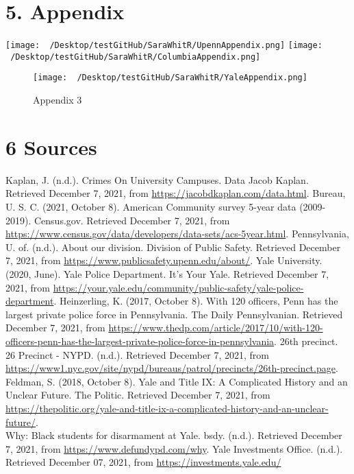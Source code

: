 \documentclass[
]{article}
\begin{document}
\hypertarget{appendix}{%
\section{5. Appendix}\label{appendix}}

\texttt{[image: ~/Desktop/testGitHub/SaraWhitR/UpennAppendix.png]}
\texttt{[image: ~/Desktop/testGitHub/SaraWhitR/ColumbiaAppendix.png]}

\begin{figure}
\centering
\texttt{[image: ~/Desktop/testGitHub/SaraWhitR/YaleAppendix.png]}
\caption{Appendix 3}
\end{figure}

\hypertarget{sources}{%
\section{6 Sources}\label{sources}}

Kaplan, J. (n.d.). Crimes On University Campuses. Data \textbar{} Jacob
Kaplan. Retrieved December 7, 2021, from
\url{https://jacobdkaplan.com/data.html}. Bureau, U. S. C. (2021,
October 8). American Community survey 5-year data (2009-2019).
Census.gov. Retrieved December 7, 2021, from
\url{https://www.census.gov/data/developers/data-sets/acs-5year.html}.
Pennsylvania, U. of. (n.d.). About our division. Division of Public
Safety. Retrieved December 7, 2021, from
\url{https://www.publicsafety.upenn.edu/about/}. Yale University. (2020,
June). Yale Police Department. It's Your Yale. Retrieved December 7,
2021, from
\url{https://your.yale.edu/community/public-safety/yale-police-department}.
Heinzerling, K. (2017, October 8). With 120 officers, Penn has the
largest private police force in Pennsylvania. The Daily Pennsylvanian.
Retrieved December 7, 2021, from
\url{https://www.thedp.com/article/2017/10/with-120-officers-penn-has-the-largest-private-police-force-in-pennsylvania}.
26th precinct. 26 Precinct - NYPD. (n.d.). Retrieved December 7, 2021,
from
\url{https://www1.nyc.gov/site/nypd/bureaus/patrol/precincts/26th-precinct.page}.
Feldman, S. (2018, October 8). Yale and Title IX: A Complicated History
and an Unclear Future. The Politic. Retrieved December 7, 2021, from
\url{https://thepolitic.org/yale-and-title-ix-a-complicated-history-and-an-unclear-future/}.\\
Why: Black students for disarmament at Yale. bsdy. (n.d.). Retrieved
December 7, 2021, from \url{https://www.defundypd.com/why}. Yale
Investments Office. (n.d.). Retrieved December 07, 2021, from
\url{https://investments.yale.edu/}
\end{document}
